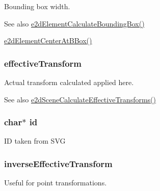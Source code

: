 Bounding box width. \begin{DoxySeeAlso}{See also}
\hyperlink{group__e2dElement_ga575c7363927670f1ea8c52b7ea23fcd5}{e2d\-Element\-Calculate\-Bounding\-Box()} 

\hyperlink{group__e2dElement_gab829b280fa22a3509c40425fc84b5061}{e2d\-Element\-Center\-At\-B\-Box()} 
\end{DoxySeeAlso}
\hypertarget{structe2dElement_a6c8e26945f09b5157e2111e42f99b879}{
\subsubsection[{effective\-Transform}]{ {\bf effective\-Transform}}}\label{structe2dElement_a6c8e26945f09b5157e2111e42f99b879}
Actual transform calculated applied here. \begin{DoxySeeAlso}{See also}
\hyperlink{group__e2dScene_ga6981f2448904c96723449cb84ffb4d8a}{e2d\-Scene\-Calculate\-Effective\-Transforms()} 
\end{DoxySeeAlso}
\hypertarget{structe2dElement_aecb3b0d045ada529257a2fbf8f829599}{
\subsubsection[{id}]{\setlength{\rightskip}{0pt plus 5cm}char$\ast$ {\bf id}}}\label{structe2dElement_aecb3b0d045ada529257a2fbf8f829599}
I\-D taken from S\-V\-G \hypertarget{structe2dElement_a5e6d7341f2dbef1923b0a3fcc13781c6}{
\subsubsection[{inverse\-Effective\-Transform}]{ {\bf inverse\-Effective\-Transform}}}\label{structe2dElement_a5e6d7341f2dbef1923b0a3fcc13781c6}
Useful for point transformations.

